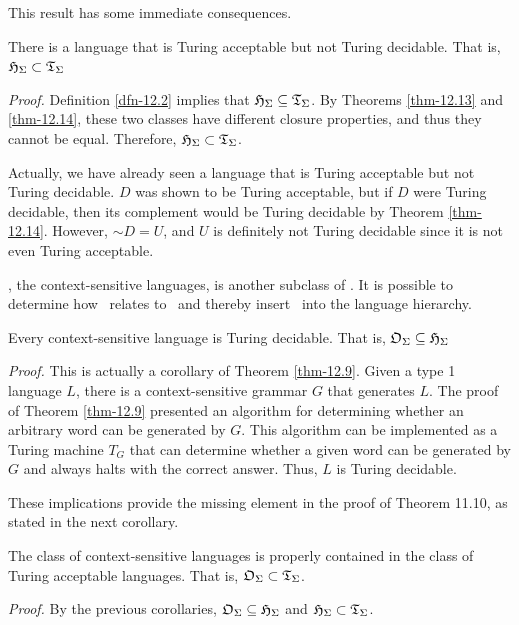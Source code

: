 This result has some immediate consequences.

\begin{cor}\label{cor-12.2}
There is a language that is Turing acceptable but not Turing decidable. That is,
$\mathfrak{H}_\Sigma\subset\mathfrak{T}_\Sigma$

\emph{Proof.} Definition \ref{dfn-12.2} implies that $\mathfrak{H}_\Sigma\subseteq\mathfrak{T}_\Sigma$. By
Theorems \ref{thm-12.13} and \ref{thm-12.14}, these two classes have different
closure properties, and thus they cannot be equal. Therefore, $\mathfrak{H}_\Sigma\subset
\mathfrak{T}_\Sigma$.
\end{cor}

Actually, we have already seen a language that is Turing acceptable but not
Turing decidable. $D$ was shown to be Turing acceptable, but if $D$ were Turing
decidable, then its complement would be Turing decidable by Theorem
\ref{thm-12.14}. However, $\sim  D=U$, and $U$ is definitely not Turing
decidable since it is not even Turing acceptable.

\OSIG, the context-sensitive languages, is another subclass of \TSIG. It is
possible to determine how \HSIG\ relates to \OSIG\ and thereby insert \HSIG\
into the language hierarchy.

\begin{cor}\label{cor-12.3}
Every context-sensitive language is Turing decidable. That is, $\mathfrak{O}_\Sigma\subseteq
\mathfrak{H}_\Sigma$

\emph{Proof.} This is actually a corollary of Theorem \ref{thm-12.9}. Given a
type 1 language $L$, there is a context-sensitive grammar $G$ that generates $L$.
The proof of Theorem \ref{thm-12.9} presented an algorithm for determining
whether an arbitrary word can be generated by $G$. This algorithm can be
implemented as a Turing machine $T_G$ that can determine whether a given word
can be generated by $G$ and always halts with the correct answer. Thus, $L$ is
Turing decidable.
\end{cor}

These implications provide the missing element in the proof of Theorem 11.10, as
stated in the next corollary.

\begin{cor}\label{cor-12.4}
The class of context-sensitive languages is properly contained in the class of
Turing acceptable languages. That is, $\mathfrak{O}_\Sigma\subset\mathfrak{T}_\Sigma$.

\emph{Proof.} By the previous corollaries, $\mathfrak{O}_\Sigma\subseteq\mathfrak{H}_\Sigma$ and $\mathfrak{H}_\Sigma
\subset\mathfrak{T}_\Sigma$.
\end{cor}

